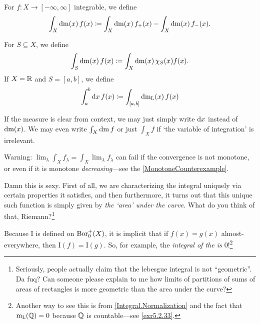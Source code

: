 \begin{thm}[Integral]
\begin{equation}
\end{equation}
\begin{rmk}
For $f:X\rightarrow [-\infty ,\infty ]$ integrable, we define
\begin{equation}
\int _X\mathop{}\!\mathrm{d} \mathrm{m} (x)\, f(x)\coloneqq \int _X\mathop{}\!\mathrm{d} \mathrm{m} (x)\, f_+(x)-\int _X\mathop{}\!\mathrm{d} \mathrm{m} (x)\, f_-(x).
\end{equation}
\end{rmk}
\begin{rmk}
For $S\subseteq X$, we define
\begin{equation}
\int _S\mathop{}\!\mathrm{d} \mathrm{m} (x)\, f(x)\coloneqq \int _X\mathop{}\!\mathrm{d} \mathrm{m} (x)\, \chi _S(x)f(x).
\end{equation}
If $X=\mathbb{R}$ and $S=[a,b]$, we define
\begin{equation}
\int _a^b\mathop{}\!\mathrm{d} x\, f(x)\coloneqq \int _{[a,b]}\mathop{}\!\mathrm{d} \mathrm{m} _{\mathrm{L}}(x)\, f(x)
\end{equation}
\end{rmk}
\begin{rmk}
If the measure is clear from context, we may just simply write $\mathop{}\!\mathrm{d} x$ instead of $\mathop{}\!\mathrm{d} \mathrm{m} (x)$.  We may even write $\int _X\mathop{}\!\mathrm{d} \mathrm{m} \, f$ or just $\int _Xf$ if `the variable of integration' is irrelevant.
\end{rmk}
\begin{rmk}
Warning:  $\lim _\lambda \int _Xf_\lambda =\int _X\lim _\lambda f_\lambda$ can fail if the convergence is not monotone, or even if it is monotone \emph{decreasing}---see the \cref{MonotoneCounterexample}.
\end{rmk}
\begin{rmk}
Damn this is sexy.  First of all, we are characterizing the integral uniquely via certain properties it satisfies, and then furthermore, it turns out that this unique such function is simply given by \emph{the `area' under the curve}.  What do you think of that, Riemann?\footnote{Seriously, people actually claim that the lebesgue integral is not ``geometric''.  Da fuq?  Can someone please explain to me how limits of partitions of sums of areas of rectangles is more geometric than the area under the curve?}
\end{rmk}
\begin{rmk}
Because $\mathrm{I}$ is defined on $\operatorname{Bor} _0^+(X)$, it is implicit that if $f(x)=g(x)$ almost-everywhere, then $\mathrm{I}(f)=\mathrm{I}(g)$.  So, for example, the \emph{integral of the  is $0$}!\footnote{Another way to see this is from \ref{Integral.Normalization} and the fact that $\mathrm{m} _{\mathrm{L}}(\mathbb{Q} )=0$ because $\mathbb{Q}$ is countable---see \cref{exr5.2.33}.}

\end{rmk}
\end{thm}
